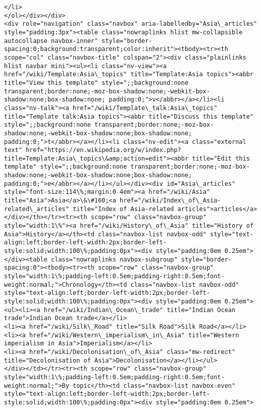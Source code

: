 \documentclass[11pt]{article}
\begin{document}
\begin{Verbatim}[commandchars=\\\{\}]
</li>
</ol></div></div>
<div role="navigation" class="navbox" aria-labelledby="Asia\_articles" style="padding:3px"><table class="nowraplinks hlist mw-collapsible autocollapse navbox-inner" style="border-spacing:0;background:transparent;color:inherit"><tbody><tr><th scope="col" class="navbox-title" colspan="2"><div class="plainlinks hlist navbar mini"><ul><li class="nv-view"><a href="/wiki/Template:Asia\_topics" title="Template:Asia topics"><abbr title="View this template" style=";;background:none transparent;border:none;-moz-box-shadow:none;-webkit-box-shadow:none;box-shadow:none; padding:0;">v</abbr></a></li><li class="nv-talk"><a href="/wiki/Template\_talk:Asia\_topics" title="Template talk:Asia topics"><abbr title="Discuss this template" style=";;background:none transparent;border:none;-moz-box-shadow:none;-webkit-box-shadow:none;box-shadow:none; padding:0;">t</abbr></a></li><li class="nv-edit"><a class="external text" href="https://en.wikipedia.org/w/index.php?title=Template:Asia\_topics\&amp;action=edit"><abbr title="Edit this template" style=";;background:none transparent;border:none;-moz-box-shadow:none;-webkit-box-shadow:none;box-shadow:none; padding:0;">e</abbr></a></li></ul></div><div id="Asia\_articles" style="font-size:114\%;margin:0 4em"><a href="/wiki/Asia" title="Asia">Asia</a>\&\#160;<a href="/wiki/Index\_of\_Asia-related\_articles" title="Index of Asia-related articles">articles</a></div></th></tr><tr><th scope="row" class="navbox-group" style="width:1\%"><a href="/wiki/History\_of\_Asia" title="History of Asia">History</a></th><td class="navbox-list navbox-odd" style="text-align:left;border-left-width:2px;border-left-style:solid;width:100\%;padding:0px"><div style="padding:0em 0.25em"></div><table class="nowraplinks navbox-subgroup" style="border-spacing:0"><tbody><tr><th scope="row" class="navbox-group" style="width:1\%;padding-left:0.5em;padding-right:0.5em;font-weight:normal;">Chronology</th><td class="navbox-list navbox-odd" style="text-align:left;border-left-width:2px;border-left-style:solid;width:100\%;padding:0px"><div style="padding:0em 0.25em">
<ul><li><a href="/wiki/Indian\_Ocean\_trade" title="Indian Ocean trade">Indian Ocean trade</a></li>
<li><a href="/wiki/Silk\_Road" title="Silk Road">Silk Road</a></li>
<li><a href="/wiki/Western\_imperialism\_in\_Asia" title="Western imperialism in Asia">Imperialism</a></li>
<li><a href="/wiki/Decolonisation\_of\_Asia" class="mw-redirect" title="Decolonisation of Asia">Decolonisation</a></li></ul>
</div></td></tr><tr><th scope="row" class="navbox-group" style="width:1\%;padding-left:0.5em;padding-right:0.5em;font-weight:normal;">By topic</th><td class="navbox-list navbox-even" style="text-align:left;border-left-width:2px;border-left-style:solid;width:100\%;padding:0px"><div style="padding:0em 0.25em">

\end{Verbatim}
\end{document}
